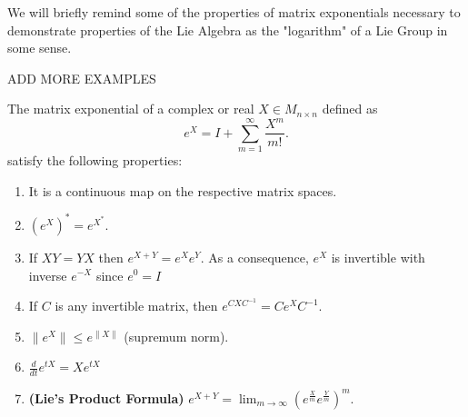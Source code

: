 	We will briefly remind some of the properties of matrix exponentials necessary to demonstrate properties of the Lie Algebra as the "logarithm" of a Lie Group in some sense.
\begin{ex}
	ADD MORE EXAMPLES \label{11EXAMPLES}
\end{ex}
\begin{prop}
	The matrix exponential of a complex or real $X \in M_{n\times n}$ defined as 
	$$e^X = I + \sum_{m=1}^\infty \frac{X^m}{m!}.$$
	satisfy the following properties:
	\begin{enumerate}[label=(\alph*)]
		\item It is a continuous map on the respective matrix spaces.
		\item $(e^X)^*=e^{X^*}$.
		\item If $XY=YX$ then $e^{X+Y}=e^Xe^Y$. As a consequence, $e^X$ is invertible with inverse $e^{-X}$ since $e^0=I$
		\item If $C$ is any invertible matrix, then $e^{CXC^{-1}}=Ce^XC^{-1}$.
		\item $\|e^X\|\le e^{\|X\|}$ (supremum norm).
		\item $\frac{d}{dt}e^{tX} = Xe^{tX}$
		\item \textbf{(Lie's Product Formula)} $e^{X+Y} = \displaystyle\lim_{m \rightarrow \infty} (e^{\frac{X}{m}}e^{\frac{Y}{m}})^m$.
	\end{enumerate}
	\label{MatrixExponential}
\end{prop}
